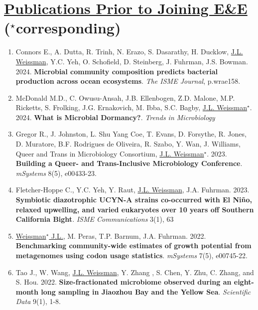 \documentclass[]{res}
\begin{document}
\begin{resume}
\begin{enumerate}[leftmargin=*]
\end{enumerate} 


 \section{\underline{Publications Prior to Joining E\&E} ($^\star$corresponding)} \vspace{1mm}
 

\begin{enumerate}[leftmargin=*]
 \setlength\itemsep{0.2em}
 
 
 
 \item Connors E., A. Dutta, R. Trinh, N. Erazo, S. Dasarathy, H. Ducklow, \underline{J.L. Weissman}, Y.C. Yeh, O. Schofield, D. Steinberg, J. Fuhrman, J.S. Bowman. 2024. {\bf Microbial community composition predicts bacterial production across ocean ecosystems}. \emph{The ISME Journal}, p.wrae158.


 \item McDonald M.D., C. Owusu-Ansah, J.B. Ellenbogen, Z.D. Malone, M.P. Ricketts, S. Frolking, J.G. Ernakovich, M. Ibba, S.C. Bagby, \underline{J.L. Weissman$^\star$}. 2024. {\bf What is Microbial Dormancy?}. \emph{Trends in Microbiology}

 \item Gregor R., J. Johnston, L. Shu Yang Coe, T. Evans, D. Forsythe, R. Jones, D. Muratore, B.F. Rodrigues de Oliveira, R. Szabo, Y. Wan, J. Williams, Queer and Trans in Microbiology Consortium, \underline{J.L. Weissman$^\star$}. 2023. {\bf Building a Queer- and Trans-Inclusive Microbiology Conference}. \emph{mSystems} 8(5), e00433-23.
 
\item Fletcher-Hoppe C., Y.C. Yeh, Y. Raut, \underline{J.L. Weissman}, J.A. Fuhrman. 2023. {\bf Symbiotic diazotrophic UCYN-A strains co-occurred with El Niño, relaxed upwelling, and varied eukaryotes over 10 years off Southern California Bight}. \emph{ISME Communications} 3(1), 63
 
  \item \underline{Weissman$^\star$ J.L.}, M. Peras, T.P. Barnum, J.A. Fuhrman. 2022. {\bf Benchmarking community-wide estimates of growth potential from metagenomes using codon usage statistics}. \emph{mSystems} 7(5), e00745-22.
  
    \item  Tao J., W. Wang, \underline{J.L. Weissman}, Y. Zhang , S. Chen, Y. Zhu, C. Zhang, and S. Hou. 2022. {\bf Size-fractionated microbiome observed during an eight-month long sampling in Jiaozhou Bay and the Yellow Sea}. \emph{Scientific Data} 9(1), 1-8.
 

\end{enumerate}
\end{resume}
\end{document}
